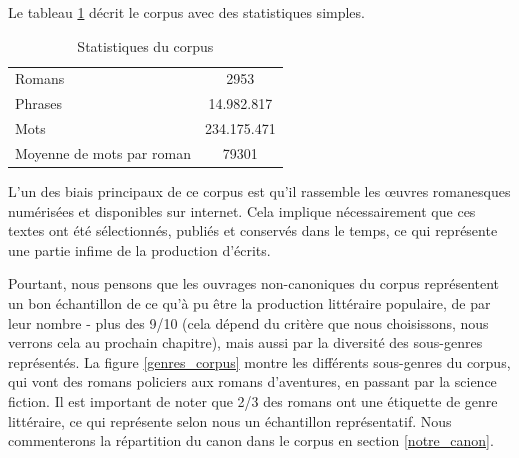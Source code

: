 Le tableau \ref{Tab:statscorpus} décrit le corpus avec des statistiques simples. 

\begin{table}[ht]
\caption{Statistiques du corpus}
\centering
\bigskip
\begin{tabular}{lc}
    \hline
    Romans &  2953 \\
    Phrases &  14.982.817 \\
    Mots &  234.175.471 \\
    Moyenne de mots par roman & 79301 \\
    \hline
\end{tabular}
 \label{Tab:statscorpus}
\end{table}
\bigskip

L'un des biais principaux de ce corpus est qu'il rassemble les œuvres romanesques numérisées et disponibles sur internet. Cela implique nécessairement que ces textes ont été sélectionnés, publiés et conservés dans le temps, ce qui représente une partie infime de la production d'écrits. 

Pourtant, nous pensons que les ouvrages non-canoniques du corpus représentent un bon échantillon de ce qu'à pu être la production littéraire populaire, de par leur nombre - plus des 9/10 (cela dépend du critère que nous choisissons, nous verrons cela au prochain chapitre), mais aussi par la diversité des sous-genres représentés. La figure \ref{genres_corpus} montre les différents sous-genres du corpus, qui vont des romans policiers aux romans d'aventures, en passant par la science fiction. Il est important de noter que 2/3 des romans ont une étiquette de genre littéraire, ce qui représente selon nous un échantillon représentatif. Nous commenterons la répartition du canon dans le corpus en section \ref{notre_canon}.

